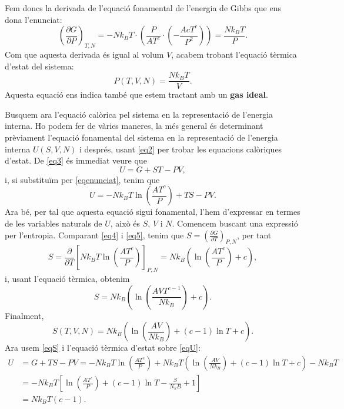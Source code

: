 \documentclass[a4paper, 10pt]{article}
\begin{document}
Fem doncs la derivada de l'equació fonamental de l'energia de Gibbs que ens dona l'enunciat:
\begin{equation*}
	\left(\frac{\partial G}{\partial P}\right)_{T,N} = -Nk_BT\cdot\left(\frac{P}{AT^c}\cdot\left(-\frac{AcT^c}{P^2}\right)\right)= \frac{Nk_BT}{P}.
\end{equation*}
Com que aquesta derivada és igual al volum $V$, acabem trobant l'equació tèrmica d'estat del sistema:
\begin{equation}
	\boxed{P(T,V,N)=\frac{Nk_BT}{V}}. \label{eq6}
\end{equation}
Aquesta equació ens indica també que estem tractant amb un \textbf{gas ideal}.

Busquem ara l'equació calòrica pel sistema en la representació de l'energia interna. Ho podem fer de vàries maneres, la més general és determinant prèviament l'equació fonamental del sistema en la representació de l'energia interna $U(S,V,N)$ i després, usant \eqref{eq2} per trobar les equacions calòriques d'estat. De \eqref{eq3} és immediat veure que
\begin{equation}
	U = G + ST - PV, \label{eqU}
\end{equation}
i, si substituïm per \eqref{eqenunciat}, tenim que
\begin{equation*}
	U = -Nk_BT\ln(\frac{AT^c}{P})+TS-PV.
\end{equation*}
Ara bé, per tal que aquesta equació sigui fonamental, l'hem d'expressar en termes de les variables naturals de $U$, això és $S$, $V$ i $N$. Comencem buscant una expressió per l'entropia. Comparant \eqref{eq4} i \eqref{eq5}, tenim que $S = \left(\frac{\partial G}{\partial T}\right)_{P,N}$, per tant
\begin{equation*}
	S = \frac{\partial}{\partial T}\left[Nk_BT\ln(\frac{AT^c}{P})\right]_{P,N} = Nk_B\left(\ln(\frac{AT^c}{P})+c\right),
\end{equation*}
i, usant l'equació tèrmica, obtenim
\begin{equation*}
	S = Nk_B\left(\ln(\frac{AVT^{c-1}}{Nk_B})+c\right).
\end{equation*}
Finalment,
\begin{equation}
	S(T,V,N) = Nk_B\left(\ln(\frac{AV}{Nk_B})+(c-1)\ln T+c\right). \label{eqS}
\end{equation}
Ara usem \eqref{eqS} i l'equació tèrmica d'estat sobre \eqref{eqU}:
\begin{align*}
	U & = G + TS - PV = -Nk_BT\ln\left(\frac{AT^c}{P}\right) + Nk_BT\left(\ln(\frac{AV}{Nk_B})+(c-1)\ln T+c\right) - Nk_BT \\
	& = -Nk_BT\left[\ln\left(\frac{AT^c}{P}\right) + (c-1)\ln T - \frac{S}{N_kB}+1\right] \\
	& = Nk_BT(c-1).
\end{align*}
\end{document}
